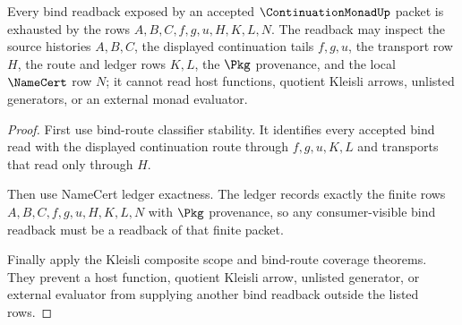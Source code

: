 \begin{theorem}
\label{thm:continuation-monad-bind-readback-exhaustion}
Every bind readback exposed by an accepted $\ContinuationMonadUp$ packet is exhausted by the rows $A,B,C,f,g,u,H,K,L,N$. The readback may inspect the source histories $A,B,C$, the displayed continuation tails $f,g,u$, the transport row $H$, the route and ledger rows $K,L$, the $\Pkg$ provenance, and the local $\NameCert$ row $N$; it cannot read host functions, quotient Kleisli arrows, unlisted generators, or an external monad evaluator.
\end{theorem}
\begin{proof}
First use bind-route classifier stability. It identifies every accepted bind read with the displayed continuation route through $f,g,u,K,L$ and transports that read only through $H$.

Then use NameCert ledger exactness. The ledger records exactly the finite rows $A,B,C,f,g,u,H,K,L,N$ with $\Pkg$ provenance, so any consumer-visible bind readback must be a readback of that finite packet.

Finally apply the Kleisli composite scope and bind-route coverage theorems. They prevent a host function, quotient Kleisli arrow, unlisted generator, or external evaluator from supplying another bind readback outside the listed rows.
\end{proof}

